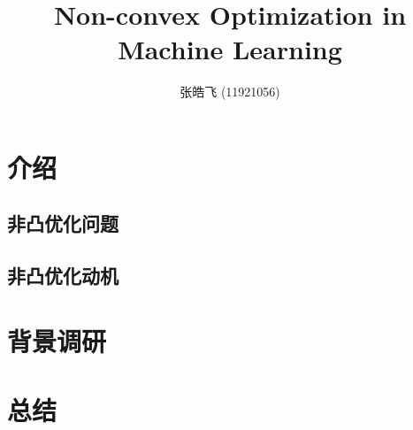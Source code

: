 \documentclass[10pt, a4paper]{article}
\begin{document}
\begin{titlepage}
\author{张皓飞 (11921056)}
\title{Non-convex Optimization in Machine Learning}
\maketitle
\thispagestyle{empty}
\end{titlepage}

\newpage
\tableofcontents
\newpage
{}

\section{介绍}

\subsection{非凸优化问题}


\subsection{非凸优化动机}


\section{背景调研}


\section{总结}


\newpage
{}
\nocite{*}
\printbibliography[heading=bibliography,title=参考文献]
\end{document}
